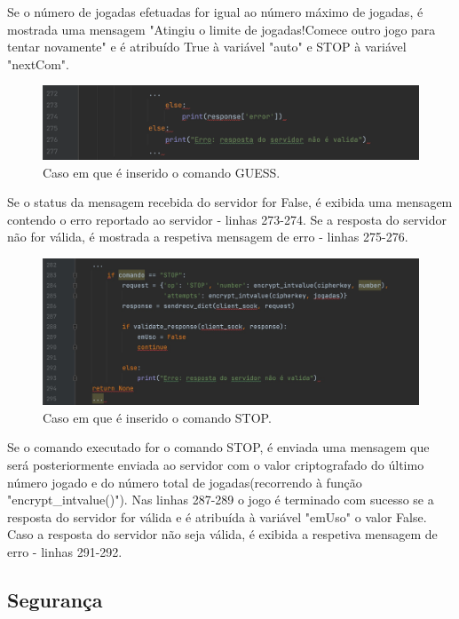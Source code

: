 \documentclass{report}
\begin{document}
Se o número de jogadas efetuadas for igual ao número máximo de jogadas, é mostrada uma mensagem "Atingiu o limite de jogadas!Comece outro jogo para tentar novamente" e é atribuído True à variável "auto" e STOP à variável "nextCom".

\begin{figure}[H]
        \centering
        \includegraphics[scale=0.43]{guess5}      
        \caption{Caso em que é inserido o comando GUESS.}
\end{figure}
Se o status da mensagem recebida do servidor for False, é exibida uma mensagem contendo o erro reportado ao servidor - linhas 273-274.
Se a resposta do servidor não for válida, é mostrada a respetiva mensagem de erro - linhas 275-276.

\begin{figure}[H]
        \centering
        \includegraphics[scale=0.20]{stop}      
        \caption{Caso em que é inserido o comando STOP.}
\end{figure}

Se o comando executado for o comando STOP, é enviada uma mensagem que será posteriormente enviada ao servidor com o valor criptografado do último número jogado e do número total de jogadas(recorrendo à função "encrypt\_intvalue()").
Nas linhas 287-289 o jogo é terminado com sucesso se a resposta do servidor for válida e é atribuída  à variável "emUso" o valor False.
Caso a resposta do servidor não seja válida, é exibida a respetiva mensagem de erro - linhas 291-292.


\subsection{Segurança}
\end{document}
